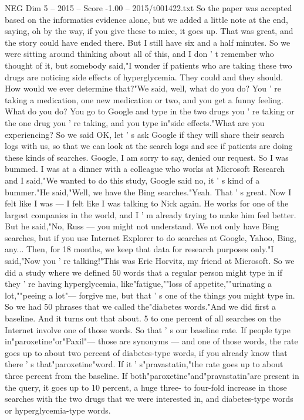 \begin{textsample}{NEG Dim 5 – 2015 – Score -1.00 – 2015/t001422.txt}
So the paper was accepted based on the informatics evidence alone, but we added a little note at the end, saying, oh by the way, if you give these to mice, it goes up.
That was great, and the story could have ended there.
But I still have six and a half minutes.
So we were sitting around thinking about all of this, and I don ' t remember who thought of it, but somebody said,"I wonder if patients who are taking these two drugs are noticing side effects of hyperglycemia.
They could and they should.
How would we ever determine that?"We said, well, what do you do?
You ' re taking a medication, one new medication or two, and you get a funny feeling.
What do you do?
You go to Google and type in the two drugs you ' re taking or the one drug you ' re taking, and you type in"side effects."What are you experiencing?
So we said OK, let ' s ask Google if they will share their search logs with us, so that we can look at the search logs and see if patients are doing these kinds of searches.
Google, I am sorry to say, denied our request.
So I was bummed.
I was at a dinner with a colleague who works at Microsoft Research and I said,"We wanted to do this study, Google said no, it ' s kind of a bummer."He said,"Well, we have the Bing searches."Yeah.
That ' s great.
Now I felt like I was — I felt like I was talking to Nick again.
He works for one of the largest companies in the world, and I ' m already trying to make him feel better.
But he said,"No, Russ — you might not understand.
We not only have Bing searches, but if you use Internet Explorer to do searches at Google, Yahoo, Bing, any...
Then, for 18 months, we keep that data for research purposes only."I said,"Now you ' re talking!"This was Eric Horvitz, my friend at Microsoft.
So we did a study where we defined 50 words that a regular person might type in if they ' re having hyperglycemia, like"fatigue,""loss of appetite,""urinating a lot,""peeing a lot"— forgive me, but that ' s one of the things you might type in.
So we had 50 phrases that we called the"diabetes words."And we did first a baseline.
And it turns out that about. 5 to one percent of all searches on the Internet involve one of those words.
So that ' s our baseline rate.
If people type in"paroxetine"or"Paxil"— those are synonyms — and one of those words, the rate goes up to about two percent of diabetes-type words, if you already know that there ' s that"paroxetine"word.
If it ' s"pravastatin,"the rate goes up to about three percent from the baseline.
If both"paroxetine"and"pravastatin"are present in the query, it goes up to 10 percent, a huge three- to four-fold increase in those searches with the two drugs that we were interested in, and diabetes-type words or hyperglycemia-type words.

\end{textsample}
